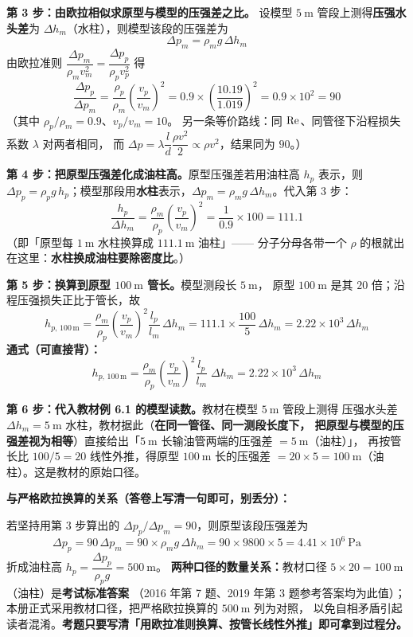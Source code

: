 \begin{jie}
\textbf{第 3 步：由欧拉相似求原型与模型的压强差之比。}
设模型 $5\ \mathrm{m}$ 管段上测得\textbf{压强水头差}为 $\Delta h_m$（水柱），则模型该段的压强差为
\[ \Delta p_m=\rho_m g\,\Delta h_m \]
由欧拉准则 $\dfrac{\Delta p_m}{\rho_m v_m^{2}}=\dfrac{\Delta p_p}{\rho_p v_p^{2}}$ 得
\[ \frac{\Delta p_p}{\Delta p_m}
   =\frac{\rho_p}{\rho_m}\left(\frac{v_p}{v_m}\right)^{2}
   =0.9\times\left(\frac{10.19}{1.019}\right)^{2}
   =0.9\times10^{2}=90 \]
（其中 $\rho_p/\rho_m=0.9$、$v_p/v_m=10$。
另一条等价路线：同 $\mathrm{Re}$、同管径下沿程损失系数 $\lambda$ 对两者相同，
而 $\Delta p=\lambda\dfrac{l}{d}\dfrac{\rho v^{2}}{2}\propto\rho v^{2}$，结果同为 $90$。）

\textbf{第 4 步：把原型压强差化成油柱高。}原型压强差若用油柱高 $h_p$ 表示，则
$\Delta p_p=\rho_p g\,h_p$；模型那段用\textbf{水柱}表示，$\Delta p_m=\rho_m g\,\Delta h_m$。代入第 3 步：
\[ \frac{h_p}{\Delta h_m}
   =\frac{\rho_m}{\rho_p}\left(\frac{v_p}{v_m}\right)^{2}
   =\frac{1}{0.9}\times100=111.1 \]
（即「原型每 $1\ \mathrm{m}$ 水柱换算成 $111.1\ \mathrm{m}$ 油柱」——
分子分母各带一个 $\rho$ 的根就出在这里：\textbf{水柱换成油柱要除密度比}。）

\textbf{第 5 步：换算到原型 $100\ \mathrm{m}$ 管长。}模型测段长 $5\ \mathrm{m}$，
原型 $100\ \mathrm{m}$ 是其 $20$ 倍；沿程压强损失正比于管长，故
\[ h_{p,\,100\,\mathrm{m}}=\frac{\rho_m}{\rho_p}
   \left(\frac{v_p}{v_m}\right)^{2}\frac{l_p}{l_m}\,\Delta h_m
   =111.1\times\frac{100}{5}\,\Delta h_m
   =2.22\times10^{3}\,\Delta h_m \]
\textbf{通式（可直接背）：}
\[ \boxed{\,h_{p,\,100\,\mathrm{m}}
   =\frac{\rho_m}{\rho_p}\left(\frac{v_p}{v_m}\right)^{2}
    \frac{l_p}{l_m}\;\Delta h_m
   =2.22\times10^{3}\,\Delta h_m\,} \]

\textbf{第 6 步：代入教材例 6.1 的模型读数。}教材在模型 $5\ \mathrm{m}$ 管段上测得
压强水头差 $\Delta h_m=5\ \mathrm{m}$ 水柱，教材据此（\textbf{在同一管径、同一测段长度下，
把原型与模型的压强差视为相等}）直接给出「$5\ \mathrm{m}$ 长输油管两端的压强差 $=5\ \mathrm{m}$（油柱）」，
再按管长比 $100/5=20$ 线性外推，得原型 $100\ \mathrm{m}$ 长的压强差
$=20\times5=100\ \mathrm{m}$（油柱）。这是教材的原始口径。

\textbf{与严格欧拉换算的关系（答卷上写清一句即可，别丢分）：}

若坚持用第 3 步算出的 $\Delta p_p/\Delta p_m=90$，则原型该段压强差为
\[ \Delta p_p=90\,\Delta p_m=90\times\rho_m g\,\Delta h_m
   =90\times9800\times5=4.41\times10^{6}\ \mathrm{Pa} \]
折成油柱高 $h_p=\dfrac{\Delta p_p}{\rho_p g}=500\ \mathrm{m}$。
\textbf{两种口径的数量关系：}教材口径 $5\times20=100\ \mathrm{m}$（油柱）是\textbf{考试标准答案}
（2016 年第 7 题、2019 年第 3 题参考答案均为此值）；
本册正式采用教材口径，把严格欧拉换算的 $500\ \mathrm{m}$ 列为对照，
以免自相矛盾引起读者混淆。\textbf{考题只要写清「用欧拉准则换算、按管长线性外推」即可拿到过程分。}


\end{jie}
